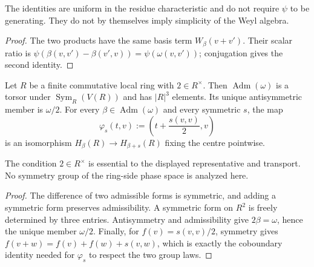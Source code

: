 \begin{scope}
The identities are uniform in the residue characteristic and do not require
$\psi$ to be generating.  They do not by themselves imply simplicity of the
Weyl algebra.
\end{scope}


\begin{proof}
The two products have the same basis term $W_\beta(v+v')$.  Their scalar
ratio is
$\psi(\beta(v,v')-\beta(v',v))=\psi(\omega(v,v'))$; conjugation gives the
second identity.
\end{proof}

\statusProvedConditional
\begin{theorem}
\label{thm:local-beta-odd}
Let $R$ be a finite commutative local ring with $2\in R^\times$.  Then
$\operatorname{Adm}(\omega)$ is a torsor under
$\operatorname{Sym}_R(V(R))$ and has $|R|^3$ elements.  Its unique
antisymmetric member is $\omega/2$.  For every
$\beta\in\operatorname{Adm}(\omega)$ and every symmetric $s$, the map
\[
 \varphi_s(t,v):=\left(t+\frac{s(v,v)}2,v\right)
\]
is an isomorphism $H_\beta(R)\to H_{\beta+s}(R)$ fixing the centre pointwise.
\end{theorem}

\begin{scope}
The condition $2\in R^\times$ is essential to the displayed representative
and transport.  No symmetry group of the ring-side phase space is analyzed
here.
\end{scope}


\begin{proof}
The difference of two admissible forms is symmetric, and adding a symmetric
form preserves admissibility.  A symmetric form on $R^2$ is freely determined
by three entries.  Antisymmetry and admissibility give $2\beta=\omega$, hence
the unique member $\omega/2$.  Finally, for
$f(v)=s(v,v)/2$, symmetry gives
$f(v+w)=f(v)+f(w)+s(v,w)$, which is exactly the coboundary identity needed
for $\varphi_s$ to respect the two group laws.
\end{proof}

